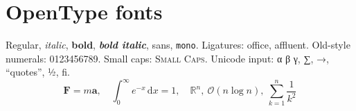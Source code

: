 \documentclass{article}
\begin{document}
\section{OpenType fonts}
Regular, \textit{italic}, \textbf{bold}, \textbf{\textit{bold italic}}, \textsf{sans}, \texttt{mono}. Ligatures: office, affluent. Old-style numerals: {0123456789}. Small caps: \textsc{Small Caps}.
Unicode input: α β γ, ∑, →, “quotes”, ½, ﬁ.
\[ \symbf{F} = m\symbf{a},\quad \int_0^\infty e^{-x}\,\mathrm{d}x = 1,\quad \mathbb{R}^n,\ \mathcal{O}(n\log n),\ \sum_{k=1}^{n}\frac{1}{k^2} \]
\end{document}
